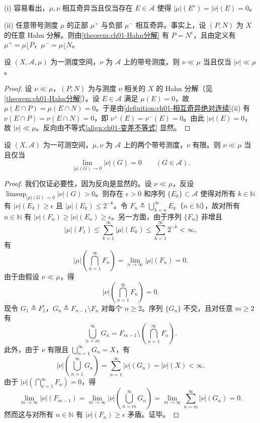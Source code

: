 \documentclass[../../main.tex]{subfiles}%
\begin{document}
\begin{remark}\label{remark:ch01-奇异绝对连续注记}
(i) 容易看出，$\mu,\nu$ 相互奇异当且仅当存在 $E\in\mathcal{A}$ 使得 $|\mu|(E^c)=|\nu|(E)=0$。

(ii) 任意带号测度 $\mu$ 的正部 $\mu^+$ 与负部 $\mu^-$ 相互奇异。事实上，设 $(P,N)$ 为 $X$ 的任意 Hahn 分解。则由\cref{theorem:ch01-Hahn分解} 有 $P=N^c$，且由定义有 $\mu^+=\mu\lfloor P$，$\mu^-=\mu\lfloor N$。
\end{remark}

\begin{lemma}\label{lemma:ch01-绝对连续等价}
设 $(X,\mathcal{A},\mu)$ 为一测度空间，$\nu$ 为 $\mathcal{A}$ 上的带号测度。则 $\nu\ll\mu$ 当且仅当 $|\nu|\ll\mu$。
\end{lemma}

\begin{proof}
设 $\nu\ll\mu$，$(P,N)$ 为与测度 $\nu$ 相关的 $X$ 的 Hahn 分解（见\cref{theorem:ch01-Hahn分解}）。设 $E\in\mathcal{A}$ 满足 $\mu(E)=0$，故 $\mu(E\cap P)=\mu(E\cap N)=0$。于是由\cref{definition:ch01-相互奇异绝对连续}(ii) 有 $\nu(E\cap P)=\nu(E\cap N)=0$，即 $\nu^+(E)=\nu^-(E)=0$。由此 $|\nu|(E)=0$，故 $|\nu|\ll\mu$。反向由不等式\eqref{align:ch01-变差不等式} 显然。
\end{proof}

\begin{lemma}\label{lemma:ch01-绝对连续epsilon-delta}
设 $(X,\mathcal{A})$ 为一可测空间，$\mu,\nu$ 为 $\mathcal{A}$ 上的两个带号测度，$\nu$ 有限。则 $\nu\ll\mu$ 当且仅当
\[
\lim_{|\mu|(G)\to0}|\nu|(G)=0\qquad(G\in\mathcal{A}).
\]
\end{lemma}

\begin{proof}
我们仅证必要性，因为反向是显然的。设 $\nu\ll\mu$，反设 $\limsup_{|\mu|(G)\to0}|\nu|(G)>0$。则存在 $\epsilon>0$ 和序列 $\{E_k\}\subset\mathcal{A}$ 使得对所有 $k\in\mathbb{N}$ 有 $|\nu|(E_k)\geqslant\epsilon$ 且 $|\mu|(E_k)\leqslant 2^{-k}$。令 $F_n\triangleq \bigcup_{k=n}^\infty E_k$（$n\in\mathbb{N}$），故对所有 $n\in\mathbb{N}$ 有 $|\nu|(F_n)\geqslant|\nu|(E_n)\geqslant\epsilon$。另一方面，由于序列 $\{F_n\}$ 非增且
\[
|\mu|(F_1)\leqslant\sum_{k=1}^\infty|\mu|(E_k)\leqslant\sum_{k=1}^\infty 2^{-k}<\infty,
\]
有
\[
|\mu|\left(\bigcap_{n=1}^\infty F_n\right)=\lim_{n\to\infty}|\mu|(F_n)=0.
\]
由于由假设 $\nu\ll\mu$，得
\[
|\nu|\left(\bigcap_{n=1}^\infty F_n\right)=0.
\]
现令 $G_1\triangleq F_1^c$，$G_n\triangleq F_{n-1}\setminus F_n$ 对每个 $n\geqslant 2$。序列 $\{G_n\}$ 不交，且对任意 $m\geqslant 2$ 有
\[
\bigcup_{n=m}^\infty G_n=F_{m-1}\setminus\left(\bigcap_{n=1}^\infty F_n\right).
\]
此外，由于 $\nu$ 有限且 $\bigcup_{n=1}^\infty G_n=X$，有
\[
|\nu|\left(\bigcup_{n=1}^\infty G_n\right)=\sum_{n=1}^\infty|\nu|(G_n)=|\nu|(X)<\infty.
\]
由于 $|\nu|\left(\bigcap_{n=1}^\infty F_n\right)=0$，得
\[
\lim_{m\to\infty}|\nu|(F_{m-1})
=\lim_{m\to\infty}|\nu|\left(\bigcup_{n=m}^\infty G_n\right)
=\lim_{m\to\infty}\sum_{n=m}^\infty|\nu|(G_n)=0.
\]
然而这与对所有 $n\in\mathbb{N}$ 有 $|\nu|(F_n)\geqslant\epsilon$ 矛盾。证毕。
\end{proof}
\end{document}
